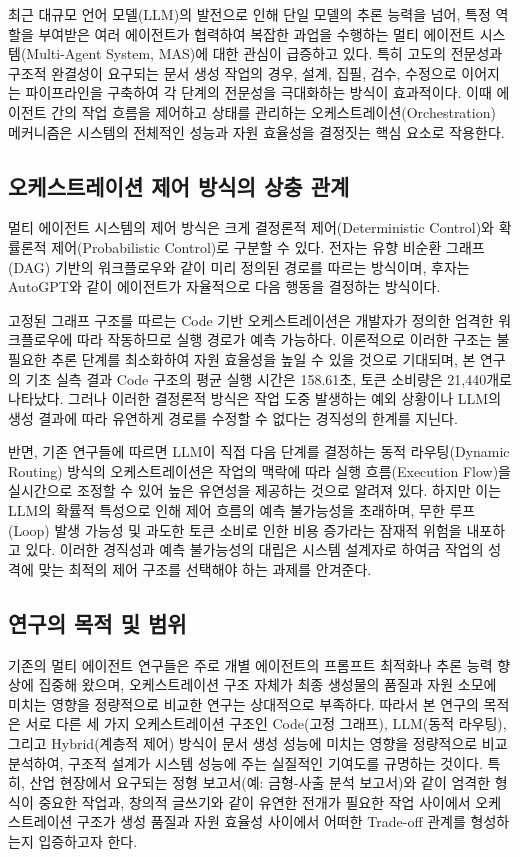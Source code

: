 최근 대규모 언어 모델(LLM)의 발전으로 인해 단일 모델의 추론 능력을 넘어, 특정 역할을 부여받은 여러 에이전트가 협력하여 복잡한 과업을 수행하는 멀티 에이전트 시스템(Multi-Agent System, MAS)에 대한 관심이 급증하고 있다. 특히 고도의 전문성과 구조적 완결성이 요구되는 문서 생성 작업의 경우, 설계, 집필, 검수, 수정으로 이어지는 파이프라인을 구축하여 각 단계의 전문성을 극대화하는 방식이 효과적이다. 이때 에이전트 간의 작업 흐름을 제어하고 상태를 관리하는 오케스트레이션(Orchestration) 메커니즘은 시스템의 전체적인 성능과 자원 효율성을 결정짓는 핵심 요소로 작용한다.

\subsection{오케스트레이션 제어 방식의 상충 관계}

멀티 에이전트 시스템의 제어 방식은 크게 결정론적 제어(Deterministic Control)와 확률론적 제어(Probabilistic Control)로 구분할 수 있다. 전자는 유향 비순환 그래프(DAG) 기반의 워크플로우와 같이 미리 정의된 경로를 따르는 방식이며, 후자는 AutoGPT와 같이 에이전트가 자율적으로 다음 행동을 결정하는 방식이다. 

고정된 그래프 구조를 따르는 Code 기반 오케스트레이션은 개발자가 정의한 엄격한 워크플로우에 따라 작동하므로 실행 경로가 예측 가능하다. 이론적으로 이러한 구조는 불필요한 추론 단계를 최소화하여 자원 효율성을 높일 수 있을 것으로 기대되며, 본 연구의 기초 실측 결과 Code 구조의 평균 실행 시간은 158.61초, 토큰 소비량은 21,440개로 나타났다. 그러나 이러한 결정론적 방식은 작업 도중 발생하는 예외 상황이나 LLM의 생성 결과에 따라 유연하게 경로를 수정할 수 없다는 경직성의 한계를 지닌다.

반면, 기존 연구들에 따르면 LLM이 직접 다음 단계를 결정하는 동적 라우팅(Dynamic Routing) 방식의 오케스트레이션은 작업의 맥락에 따라 실행 흐름(Execution Flow)을 실시간으로 조정할 수 있어 높은 유연성을 제공하는 것으로 알려져 있다. 하지만 이는 LLM의 확률적 특성으로 인해 제어 흐름의 예측 불가능성을 초래하며, 무한 루프(Loop) 발생 가능성 및 과도한 토큰 소비로 인한 비용 증가라는 잠재적 위험을 내포하고 있다. 이러한 경직성과 예측 불가능성의 대립은 시스템 설계자로 하여금 작업의 성격에 맞는 최적의 제어 구조를 선택해야 하는 과제를 안겨준다.

\subsection{연구의 목적 및 범위}

기존의 멀티 에이전트 연구들은 주로 개별 에이전트의 프롬프트 최적화나 추론 능력 향상에 집중해 왔으며, 오케스트레이션 구조 자체가 최종 생성물의 품질과 자원 소모에 미치는 영향을 정량적으로 비교한 연구는 상대적으로 부족하다. 따라서 본 연구의 목적은 서로 다른 세 가지 오케스트레이션 구조인 Code(고정 그래프), LLM(동적 라우팅), 그리고 Hybrid(계층적 제어) 방식이 문서 생성 성능에 미치는 영향을 정량적으로 비교 분석하여, 구조적 설계가 시스템 성능에 주는 실질적인 기여도를 규명하는 것이다. 특히, 산업 현장에서 요구되는 정형 보고서(예: 금형-사출 분석 보고서)와 같이 엄격한 형식이 중요한 작업과, 창의적 글쓰기와 같이 유연한 전개가 필요한 작업 사이에서 오케스트레이션 구조가 생성 품질과 자원 효율성 사이에서 어떠한 Trade-off 관계를 형성하는지 입증하고자 한다.

